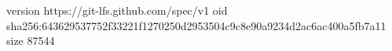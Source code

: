version https://git-lfs.github.com/spec/v1
oid sha256:643629537752f33221f1270250d2953504c9c8e90a9234d2ac6ac400a5fb7a11
size 87544
